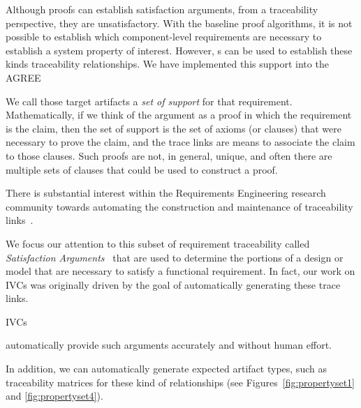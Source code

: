 Although proofs can establish satisfaction arguments, from a traceability perspective, they are unsatisfactory.  With the baseline proof algorithms, it is not possible to establish which component-level requirements are necessary to establish a system property of interest.  However, \mivc s can be used to establish these kinds traceability relationships.  We have implemented this support into the AGREE
\fi


\iffalse


We call those target artifacts a \emph{set of support} for that requirement. Mathematically, if we think of the argument as a proof in which the requirement is the claim, then the set of support is the set of axioms (or clauses) that were necessary to prove the claim, and the trace links are means to associate the claim to those clauses. Such proofs are not, in general, unique, and often there are multiple sets of clauses that could be used to construct a proof.

There is substantial interest within the Requirements Engineering research community towards automating the construction and maintenance of traceability links~\cite{hayes2003improving, egyed2002automating,cleland2007best}.
%
%

We focus our attention to this subset of requirement traceability called {\em Satisfaction Arguments}~\cite{Hammond01:WiW} that are used to determine the portions of a design or model that are necessary to satisfy a functional requirement.
In fact, our work on IVCs was originally driven by the goal of automatically generating these trace links.

IVCs

automatically provide such arguments accurately and without human effort.

In addition, we can automatically generate expected artifact types, such as traceability matrices for these kind of relationships (see Figures~\ref{fig:propertyset1} and \ref{fig:propertyset4}).


